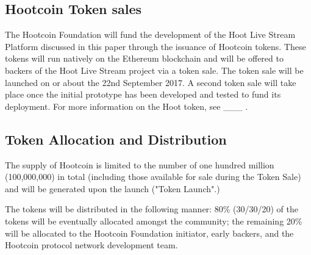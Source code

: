 \documentclass{article}
\begin{document}
\subsection{Hootcoin Token sales} %
\label{sub:hoot_token_sales}
The Hootcoin Foundation will fund the development of the Hoot Live Stream Platform discussed in this paper through the issuance of Hootcoin tokens. These tokens will run natively on the Ethereum blockchain and will be offered to backers of the Hoot Live Stream  project via a token sale. The token sale will be launched on or about the 22nd September 2017. A second token sale will take place once the initial prototype has been developed and tested to fund its deployment. For more information on the Hoot token, see \_\_\_ .

\subsection{Token Allocation and Distribution} %
\label{sub:token_allocation_and_distribution}
 The supply of Hootcoin is limited to the number of one hundred million (100,000,000) in total (including those available for sale during the Token Sale) and will be generated upon the launch ("Token Launch".)

 The tokens will be distributed in the following manner:
80\% (30/30/20) of the tokens will be eventually allocated amongst the community; the remaining 20\% will be allocated to the Hootcoin Foundation initiator, early backers, and the Hootcoin protocol network development team.
\end{document}
